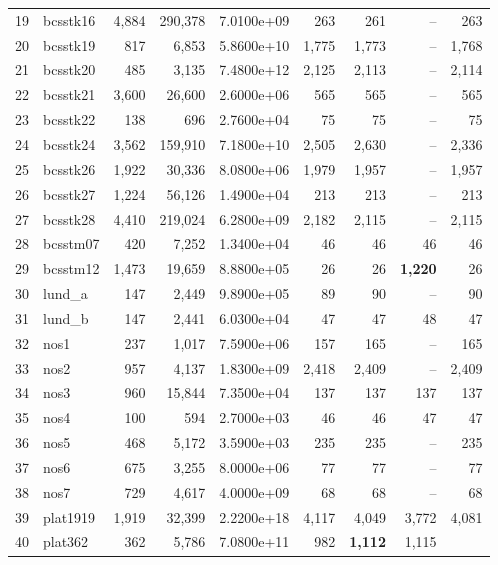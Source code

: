 \begin{table}[p]
\begin{center}
\begin{tabular}{rlrrr||rrrr}
 19 &   bcsstk16 & 4,884 &   290,378 & 7.0100e+09 & 263 &  261 &  -- &  263 \\
 20 &   bcsstk19 &  817 &     6,853 & 5.8600e+10 &1,775 & 1,773 &  -- & 1,768 \\
 21 &   bcsstk20 &  485 &     3,135 & 7.4800e+12 &2,125 & 2,113 &  -- & 2,114 \\
 22 &   bcsstk21 & 3,600 &    26,600 & 2.6000e+06 & 565 &  565 &  -- &  565 \\
 23 &   bcsstk22 &  138 &      696 & 2.7600e+04 &  75 &   75 &  -- &   75 \\
 24 &   bcsstk24 & 3,562 &   159,910 & 7.1800e+10 &2,505 & 2,630 &  -- & 2,336 
 \\
 25 &   bcsstk26 & 1,922 &    30,336 & 8.0800e+06 &1,979 & 1,957 &  -- & 1,957 
 \\
 26 &   bcsstk27 & 1,224 &    56,126 & 1.4900e+04 & 213 &  213 &  -- &  213 \\
 27 &   bcsstk28 & 4,410 &   219,024 & 6.2800e+09 &2,182 & 2,115 &  -- & 2,115 
 \\
 28 &   bcsstm07 &  420 &     7,252 & 1.3400e+04 &  46 &   46 &   46 &   46 \\
 29 &   bcsstm12 & 1,473 &    19,659 & 8.8800e+05 &  26 &   26 & \textbf{1,220} 
 &   26 \\
 30 &    lund\_a &  147 &     2,449 & 9.8900e+05 &  89 &   90 &  -- &   90 \\
 31 &    lund\_b &  147 &     2,441 & 6.0300e+04 &  47 &   47 &   48 &   47 \\
 32 &       nos1 &  237 &     1,017 & 7.5900e+06 & 157 &  165 &  -- &  165 \\
 33 &       nos2 &  957 &     4,137 & 1.8300e+09 &2,418 & 2,409 &  -- & 2,409 \\
 34 &       nos3 &  960 &    15,844 & 7.3500e+04 & 137 &  137 &  137 &  137 \\
 35 &       nos4 &  100 &      594 & 2.7000e+03 &  46 &   46 &   47 &   47 \\
 36 &       nos5 &  468 &     5,172 & 3.5900e+03 & 235 &  235 &  -- &  235 \\
 37 &       nos6 &  675 &     3,255 & 8.0000e+06 &  77 &   77 &  -- &   77 \\
 38 &       nos7 &  729 &     4,617 & 4.0000e+09 &  68 &   68 &  -- &   68 \\
 39 &   plat1919 & 1,919 &    32,399 & 2.2200e+18 &4,117 & 4,049 & 3,772 & 
 4,081 \\
 40 &    plat362 &  362 &     5,786 & 7.0800e+11 & 982 & \textbf{1,112} & 1,115 

\end{tabular}
\end{center}
\end{table}
